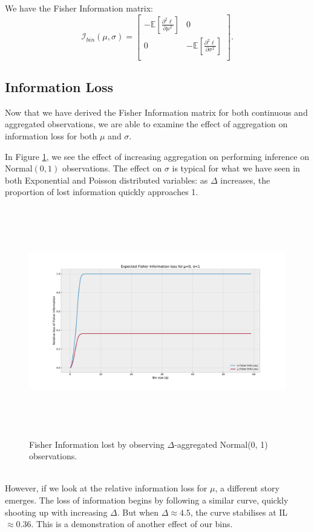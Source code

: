 \documentclass[11pt,a4,twosided,singlespacing,titlepagenumber=on,numbers=endperiod]{scrreprt}
\numberwithin{equation}{chapter} %
\theoremstyle{remark}
\begin{document}
We have the Fisher Information matrix:
\begin{equation}\label{eq:normal_binned_fisher}
	\mathcal{I}_{bin}(\mu, \sigma) = \begin{bmatrix}
		-\mathbb{E}\left[\frac{\partial^2 \ell}{\partial \mu^2}\right] & 0 \\
		0 & -\mathbb{E}\left[\frac{\partial^2 \ell}{\partial \sigma^2}\right] \\
	\end{bmatrix}.
\end{equation}
\newpage
\subsection{Information Loss}\label{subsec:normal_info_loss}
Now that we have derived the Fisher Information matrix for both continuous and aggregated observations, we are able to examine the effect of aggregation on information loss for both $\mu$ and $\sigma$.

In Figure \ref{fig:normal_0_1_info_loss}, we see the effect of increasing aggregation on performing inference on Normal$(0, 1)$ observations. The effect on $\sigma$ is typical for what we have seen in both Exponential and Poisson distributed variables: as $\Delta$ increases, the proportion of lost information quickly approaches 1. \\
\begin{figure}[!h]
	\includegraphics[height=10cm, width=14cm]{mu0sig1.pdf}
	\centering
	\caption{Fisher Information lost by observing $\Delta$-aggregated Normal(0, 1) observations.}
	\label{fig:normal_0_1_info_loss}
\end{figure}\\\noindent
However, if we look at the relative information loss for $\mu$, a different story emerges. The loss of information begins by following a similar curve, quickly shooting up with increasing $\Delta$. But when $\Delta \approx 4.5$, the curve stabilises at IL $\approx 0.36$. This is a demonstration of another effect of our bins. 
\end{document}

